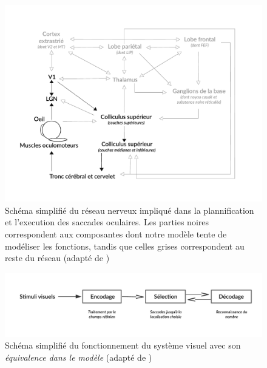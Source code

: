 \begin{figure}[th]
\centering
\includegraphics[scale=0.8]{Figures/saccadic_sys}
\decoRule %
\caption[Figure]{Schéma simplifié du réseau nerveux impliqué dans la plannification et l'execution des saccades oculaires. Les parties noires correspondent aux composantes dont notre modèle tente de modéliser les fonctions, tandis que celles grises correspondent au reste du réseau (adapté de \cite{Zhaoping2014})}
\label{fig:saccadic_sys}
\end{figure}

\begin{figure}[th]
\centering
\includegraphics[scale=0.75]{Figures/visual_system_simple}
\decoRule %
\caption[Figure]{Schéma simplifié du fonctionnement du système visuel avec son \textit{équivalence dans le modèle} (adapté de \cite{Zhaoping2014})}
\label{fig:visual_system_simple}
\end{figure}


